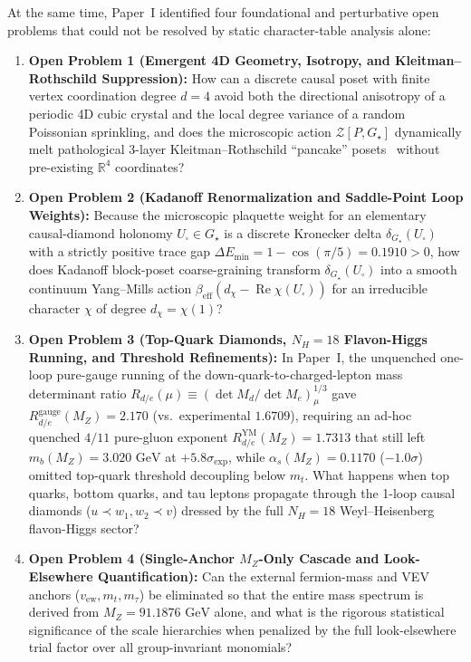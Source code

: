 \documentclass[11pt,a4paper]{article}
\theoremstyle{definition}
\theoremstyle{remark}
\newcommand{\R}{\mathbb{R}}
\newcommand{\Gstar}{G_\star}
\begin{document}
At the same time, Paper~I identified four foundational and perturbative open problems that could not be resolved by static character-table analysis alone:
\begin{enumerate}
    \item \textbf{Open Problem 1 (Emergent 4D Geometry, Isotropy, and Kleitman--Rothschild Suppression):} How can a discrete causal poset with finite vertex coordination degree $d = 4$ avoid both the directional anisotropy of a periodic 4D cubic crystal and the local degree variance of a random Poissonian sprinkling, and does the microscopic action $\mathcal{Z}[P, \Gstar]$ dynamically melt pathological 3-layer Kleitman--Rothschild ``pancake'' posets~\cite{KleitmanRothschild1975} without pre-existing $\R^4$ coordinates?
    \item \textbf{Open Problem 2 (Kadanoff Renormalization and Saddle-Point Loop Weights):} Because the microscopic plaquette weight for an elementary causal-diamond holonomy $U_\square \in \Gstar$ is a discrete Kronecker delta $\delta_{\Gstar}(U_\square)$ with a strictly positive trace gap $\Delta E_{\min} = 1 - \cos(\pi/5) = 0.1910 > 0$, how does Kadanoff block-poset coarse-graining transform $\delta_{\Gstar}(U_\square)$ into a smooth continuum Yang--Mills action $\beta_{\mathrm{eff}}(d_\chi - \operatorname{Re}\chi(U_\square))$ for an irreducible character $\chi$ of degree $d_\chi = \chi(1)$?
    \item \textbf{Open Problem 3 (Top-Quark Diamonds, $N_H = 18$ Flavon-Higgs Running, and Threshold Refinements):} In Paper~I, the unquenched one-loop pure-gauge running of the down-quark-to-charged-lepton mass determinant ratio $R_{d/e}(\mu) \equiv (\det M_d / \det M_e)_\mu^{1/3}$ gave $R_{d/e}^{\mathrm{gauge}}(M_Z) = 2.170$ (vs.\ experimental $1.6709$), requiring an ad-hoc quenched $4/11$ pure-gluon exponent $R_{d/e}^{\mathrm{YM}}(M_Z) = 1.7313$ that still left $m_b(M_Z) = 3.020\text{ GeV}$ at $+5.8\sigma_{\mathrm{exp}}$, while $\alpha_s(M_Z) = 0.1170$ ($-1.0\sigma$) omitted top-quark threshold decoupling below $m_t$. What happens when top quarks, bottom quarks, and tau leptons propagate through the 1-loop causal diamonds ($u \prec w_1, w_2 \prec v$) dressed by the full $N_H = 18$ Weyl--Heisenberg flavon-Higgs sector?
    \item \textbf{Open Problem 4 (Single-Anchor $M_Z$-Only Cascade and Look-Elsewhere Quantification):} Can the external fermion-mass and VEV anchors ($v_{\mathrm{ew}}, m_t, m_\tau$) be eliminated so that the entire mass spectrum is derived from $M_Z = 91.1876\text{ GeV}$ alone, and what is the rigorous statistical significance of the scale hierarchies when penalized by the full look-elsewhere trial factor over all group-invariant monomials?
\end{enumerate}
\end{document}
